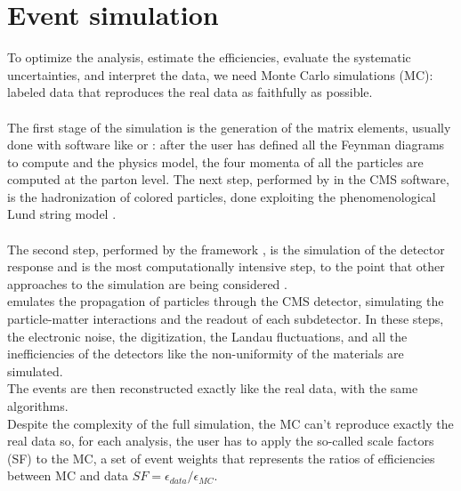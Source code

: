 \section{Event simulation}
To optimize the analysis, estimate the efficiencies, evaluate the systematic uncertainties, and interpret the data, we need Monte Carlo simulations (MC): labeled data that reproduces the real data as faithfully as possible.\\
\\
The first stage of the simulation is the generation of the matrix elements, usually done with software like \MADGRAPH \cite{Alwall2011MadGraphBeyond} or \POWHEG \cite{Alioli2010ABOX}: after the user has defined all the Feynman diagrams to compute and the physics model, the four momenta of all the particles are computed at the parton level.
The next step, performed by \PYTHIA \cite{Sjostrand2006PYTHIAManual} in the CMS software, is the hadronization of colored particles, done exploiting the phenomenological Lund string model \cite{Andersson1983PartonDynamics}.\\
\\
The second step, performed by the \GEANTfour framework \cite{Agostinelli2003GEANT4--aToolkit}, is the simulation of the detector response and is the most computationally intensive step, to the point that other approaches to the simulation are being considered \cite{Sekmen2016RecentSimulation,Vaselli2023FlashSimFlow}.\\
\GEANT emulates the propagation of particles through the CMS detector, simulating the particle-matter interactions and the readout of each subdetector. In these steps, the electronic noise, the digitization, the Landau fluctuations, and all the inefficiencies of the detectors like the non-uniformity of the materials are simulated.\\
The events are then reconstructed exactly like the real data, with the same algorithms.\\
Despite the complexity of the full simulation, the MC can't reproduce exactly the real data so, for each analysis, the user has to apply the so-called scale factors (SF) to the MC, a set of event weights that represents the ratios of efficiencies between MC and data $SF=\epsilon_{data}/\epsilon_{MC}$.

